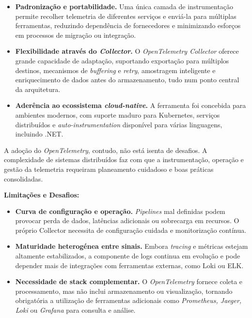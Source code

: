 \begin{itemize}
    \item \textbf{Padronização e portabilidade.} Uma única camada de instrumentação permite recolher telemetria de diferentes serviços e enviá-la para múltiplas ferramentas, reduzindo dependência de fornecedores e minimizando esforços em processos de migração ou integração.
    
    \item \textbf{Flexibilidade através do \textit{ Collector}.} O \textit{OpenTelemetry Collector} oferece grande capacidade de adaptação, suportando exportação para múltiplos destinos, mecanismos de \textit{buffering} e \textit{retry}, amostragem inteligente e enriquecimento de dados antes do armazenamento, tudo num ponto central da arquitetura.
    
    \item \textbf{Aderência ao ecossistema \textit{cloud-native}.} A ferramenta foi concebida para ambientes modernos, com suporte maduro para Kubernetes, serviços distribuídos e \textit{auto-instrumentation} disponível para várias linguagens, incluindo .NET.
\end{itemize}

A adoção do \textit{OpenTelemetry}, contudo, não está isenta de desafios. A complexidade de sistemas distribuídos faz com que a instrumentação, operação e gestão da telemetria requeiram planeamento cuidadoso e boas práticas consolidadas.

\textbf{Limitações e Desafios:}

\begin{itemize}
    \item \textbf{Curva de configuração e operação.} \textit{Pipelines} mal definidas podem provocar perda de dados, latências adicionais ou sobrecarga em recursos. O próprio Collector necessita de configuração cuidada e monitorização contínua.
    
    \item \textbf{Maturidade heterogénea entre sinais.} Embora \textit{tracing} e métricas estejam altamente estabilizados, a componente de logs continua em evolução e pode depender mais de integrações com ferramentas externas, como Loki ou ELK.
    
    \item \textbf{Necessidade de stack complementar.} O \textit{OpenTelemetry} fornece coleta e processamento, mas não inclui armazenamento ou visualização, tornando obrigatória a utilização de ferramentas adicionais como \textit{ Prometheus, Jaeger, Loki} ou \textit{ Grafana} para consulta e análise.
\end{itemize}

